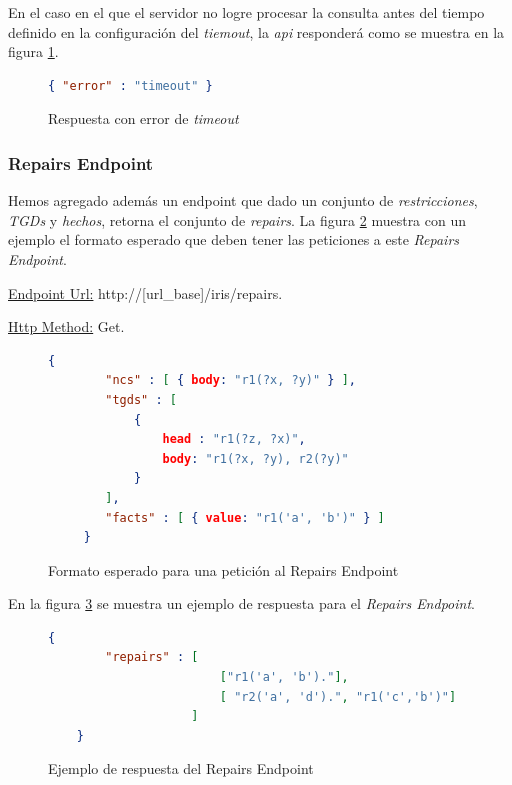 \documentclass[11pt,a4paper,twoside]{tesis}
\begin{document}
En el caso en el que el servidor no logre procesar la consulta antes del tiempo definido en la configuración del \textit{tiemout}, la \textit{api} responderá como se muestra en la figura \ref{fig:query_endpoint_answer_timeout}. 

\begin{figure}[ht]
    \begin{lstlisting}[language=json,firstnumber=1]
    { "error" : "timeout" }
    \end{lstlisting}
    \caption{Respuesta con error de \textit{timeout}}
    \label{fig:query_endpoint_answer_timeout}
\end{figure}

\subsubsection{Repairs Endpoint}

Hemos agregado además un endpoint que dado un conjunto de \textit{restricciones}, \textit{TGDs} y \textit{hechos}, retorna el conjunto de \textit{repairs}. La figura \ref{fig:repairs_endpoint} muestra con un ejemplo el formato esperado que deben tener las peticiones a este \textit{Repairs Endpoint}.

\underline{Endpoint Url:} http://[url\_base]/iris/repairs.

\underline{Http Method:} Get.

\begin{figure}[ht]
    \begin{lstlisting}[language=json,firstnumber=1]
     {
    	"ncs" : [ { body: "r1(?x, ?y)" } ],
        "tgds" : [
            {
            	head : "r1(?z, ?x)",
            	body: "r1(?x, ?y), r2(?y)"
            }
        ],
    	"facts" : [ { value: "r1('a', 'b')" } ]
     }
    \end{lstlisting}
    \caption{Formato esperado para una petición al Repairs Endpoint}
    \label{fig:repairs_endpoint}
\end{figure}

En la figura \ref{fig:repairs_endpoint_answer} se muestra un ejemplo de respuesta para el \textit{Repairs Endpoint}.
\begin{figure}[ht]
    \begin{lstlisting}[language=json,firstnumber=1]
    {
    	"repairs" : [
    	                ["r1('a', 'b')."], 
    	                [ "r2('a', 'd').", "r1('c','b')"]
    	            ]
    }
    \end{lstlisting}
    \caption{Ejemplo de respuesta del Repairs Endpoint}
    \label{fig:repairs_endpoint_answer}
\end{figure}
\end{document}
